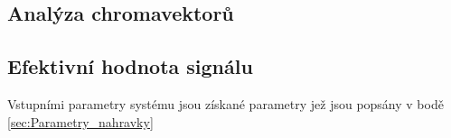 \subsection{Analýza chromavektorů}

\subsection{Efektivní hodnota signálu}


Vstupními parametry systému jsou získané parametry jež jsou popsány v bodě \ref{sec:Parametry_nahravky} 

